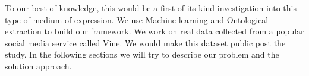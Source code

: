 To our best of knowledge, this would be a first of its kind investigation into this type of medium of expression. We use Machine learning and Ontological extraction to build our framework.
We work on real data collected from a popular social media service called Vine. We would make this dataset public post the study. In the following sections we will try to describe our problem and the solution approach.
